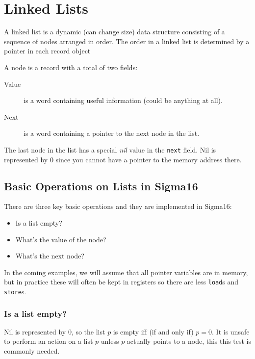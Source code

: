 \section{Linked Lists}\label{sec:linked_lists}

A linked list is a dynamic (can change size) data structure consisting of a sequence of nodes arranged in order.
The order in a linked list is determined by a pointer in each record object

A node is a record with a total of two fields:
\begin{description}
	\item[Value] is a word containing useful information (could be anything at all).
	\item[Next] is a word containing a pointer to the next node in the list.
\end{description}
%
The last node in the list has a special \emph{nil} value in the \texttt{next} field.
Nil is represented by \(0\) since you cannot have a pointer to the memory address there.

\subsection{Basic Operations on Lists in Sigma16}\label{sub:basic_operations_on_lists_in_sigma16}

There are three key basic operations and they are implemented in Sigma16:
\begin{itemize}
	\item Is a list empty?
	\item What's the value of the node?
	\item What's the next node?
\end{itemize}

\begin{note}
	In the coming examples, we will assume that all pointer variables are in memory, but in practice these will often be kept in registers so there are less \texttt{load}s and \texttt{store}s.
\end{note}

\subsubsection{Is a list empty?}\label{ssub:is_a_list_empty_}

Nil is represented by \(0\), so the list \(p\) is empty iff (if and only if) \(p=0\).
It is unsafe to perform an action on a list  \(p\) unless \(p\) actually points to a node, this this test is commonly needed.

